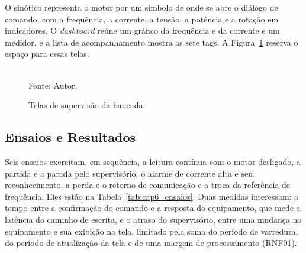 \par O sinótico representa o motor por um símbolo de onde se abre o diálogo de comando, com a frequência, a corrente, a tensão, a potência e a rotação em indicadores. O \emph{dashboard} reúne um gráfico da frequência e da corrente e um medidor, e a lista de acompanhamento mostra as sete tags. A Figura~\ref{fig:cap6_telas_movi} reserva o espaço para essas telas.

\begin{figure}[H]
    \centering
    \caption{Telas de supervisão da bancada.}
    \label{fig:cap6_telas_movi}
    \vspace{0.2cm} \\
    Fonte: Autor.
\end{figure}

\subsection{Ensaios e Resultados}

\par Seis ensaios exercitam, em sequência, a leitura contínua com o motor desligado, a partida e a parada pelo supervisório, o alarme de corrente alta e seu reconhecimento, a perda e o retorno de comunicação e a troca da referência de frequência. Eles estão na Tabela~\ref{tab:cap6_ensaios}. Duas medidas interessam: o tempo entre a confirmação do comando e a resposta do equipamento, que mede a latência do caminho de escrita, e o atraso do supervisório, entre uma mudança no equipamento e sua exibição na tela, limitado pela soma do período de varredura, do período de atualização da tela e de uma margem de processamento (RNF01).

